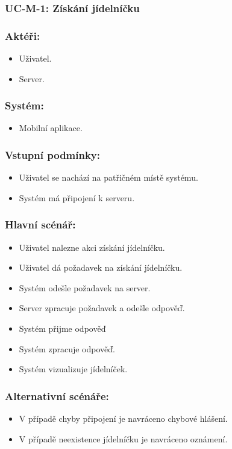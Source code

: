 \subsubsection{UC-M-1: Získání jídelníčku}
\subsubsection*{Aktéři:}
\begin{itemize}
 \item Uživatel.
 \item Server.
\end{itemize}
\subsubsection*{Systém:}
\begin{itemize}
 \item Mobilní aplikace.
\end{itemize}
\subsubsection*{Vstupní podmínky:}
\begin{itemize}
 \item Uživatel se nachází na patřičném místě systému.
 \item Systém má připojení k serveru.
\end{itemize}
\subsubsection*{Hlavní scénář:}
\begin{itemize}
 \item Uživatel nalezne akci získání jídelníčku.
 \item Uživatel dá požadavek na získání jídelníčku.
 \item Systém odešle požadavek na server.
 \item Server zpracuje požadavek a odešle odpověď.
 \item Systém přijme odpověď
 \item Systém zpracuje odpověď.
 \item Systém vizualizuje jídelníček.
\end{itemize}
\subsubsection*{Alternativní scénáře:}
\begin{itemize}
 \item V případě chyby připojení je navráceno chybové hlášení.
 \item V případě neexistence jídelníčku je navráceno oznámení.
\end{itemize}
